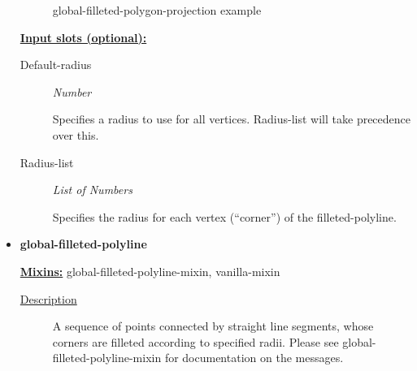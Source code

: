 \documentclass [11pt]{book}
\begin{document}
\begin{itemize}
\begin{figure}
\caption{global-filleted-polygon-projection example}

\label{fig:global-filleted-polygon-projection}

\end{figure}





\textbf{
\underline{Input slots (optional):}}

\begin{description}

\item [Default-radius]
\emph{Number}

 Specifies a radius to use for all vertices. Radius-list will take precedence over this.




\item [Radius-list]
\emph{List of Numbers}

 Specifies the radius for each vertex (``corner'') of the filleted-polyline.




\end{description}







\item {}
\label{prim:global-filleted-polyline}
\textbf{global-filleted-polyline}


\textbf{
\underline{Mixins:}} global-filleted-polyline-mixin, vanilla-mixin





\begin{description}

\item [
\underline{Description}]


A sequence of points connected by straight line segments, whose
corners are filleted according to specified radii. Please see global-filleted-polyline-mixin
for documentation on the messages.



\end{description}




\begin{figure}
\begin{lrbox}{\boxedverb}
\begin{minipage}{\linewidth}
{\small

}
\end{minipage}
\end{lrbox}
\end{figure}
\end{itemize}
\end{document}
